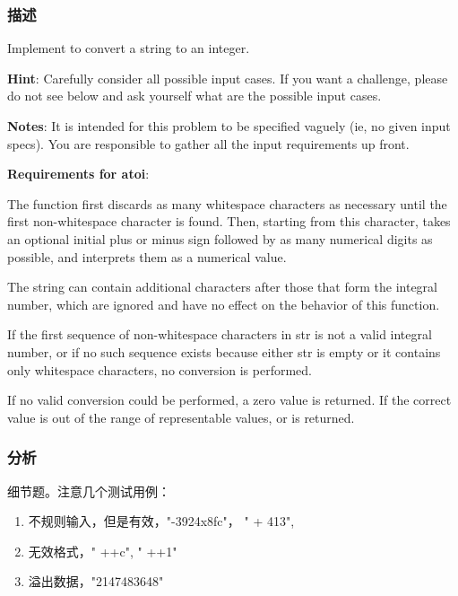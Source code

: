 \subsubsection{描述}
Implement  to convert a string to an integer.

\textbf{Hint}: Carefully consider all possible input cases. If you want a challenge, please do not see below and ask yourself what are the possible input cases.

\textbf{Notes}: It is intended for this problem to be specified vaguely (ie, no given input specs). You are responsible to gather all the input requirements up front.

\textbf{Requirements for atoi}:

The function first discards as many whitespace characters as necessary until the first non-whitespace character is found. Then, starting from this character, takes an optional initial plus or minus sign followed by as many numerical digits as possible, and interprets them as a numerical value.

The string can contain additional characters after those that form the integral number, which are ignored and have no effect on the behavior of this function.

If the first sequence of non-whitespace characters in str is not a valid integral number, or if no such sequence exists because either str is empty or it contains only whitespace characters, no conversion is performed.

If no valid conversion could be performed, a zero value is returned. If the correct value is out of the range of representable values,  or  is returned.

\subsubsection{分析}
细节题。注意几个测试用例：
\begin{enumerate}
\item 不规则输入，但是有效，"-3924x8fc"， "  +  413",
\item 无效格式，" ++c", " ++1"
\item 溢出数据，"2147483648"
\end{enumerate}

